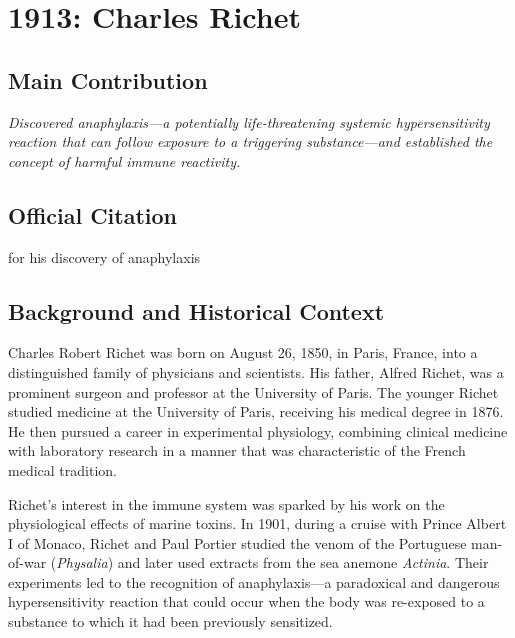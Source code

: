 \chapter[1913 --- Richet]{1913: Charles Richet}
\label{ch:1913_charlesrichet}

\section*{Main Contribution}

\textit{Discovered anaphylaxis---a potentially life-threatening systemic hypersensitivity reaction that can follow exposure to a triggering substance---and established the concept of harmful immune reactivity.}\cite{nobel-1913,lecture-1913}

\section{Official Citation}

for his discovery of anaphylaxis

\section{Background and Historical Context}

Charles Robert Richet was born on August 26, 1850, in Paris, France, into a distinguished family of physicians and scientists. His father, Alfred Richet, was a prominent surgeon and professor at the University of Paris. The younger Richet studied medicine at the University of Paris, receiving his medical degree in 1876. He then pursued a career in experimental physiology, combining clinical medicine with laboratory research in a manner that was characteristic of the French medical tradition.

Richet's interest in the immune system was sparked by his work on the physiological effects of marine toxins. In 1901, during a cruise with Prince Albert I of Monaco, Richet and Paul Portier studied the venom of the Portuguese man-of-war (\emph{Physalia}) and later used extracts from the sea anemone \emph{Actinia}. Their experiments led to the recognition of anaphylaxis---a paradoxical and dangerous hypersensitivity reaction that could occur when the body was re-exposed to a substance to which it had been previously sensitized.\cite{richet-lecture,richet-history}

